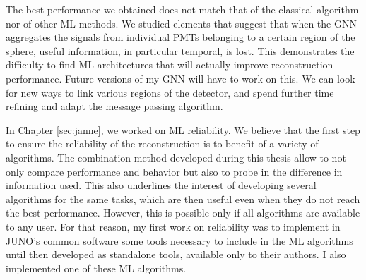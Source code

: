 \documentclass[../main.tex]{subfiles}
\begin{document}
The best performance we obtained does not match that of the classical algorithm nor of other ML methods. We studied elements that suggest that when the GNN aggregates the signals from individual PMTs belonging to a certain region of the sphere, useful information, in particular temporal, is lost. This demonstrates the difficulty to find ML architectures that will actually improve reconstruction performance. Future versions of my GNN will have to work on this. We can look for new ways to link various regions of the detector, and spend further time refining and adapt the message passing algorithm.

\hfill

%
%

In Chapter \ref{sec:janne}, we worked on ML reliability. We believe that the first step to ensure the reliability of the reconstruction is to benefit of a variety of algorithms. The combination method developed during this thesis allow to not only compare performance and behavior but also to probe in the difference in information used. This also underlines the interest of developing several algorithms for the same tasks, which are then useful even when they do not reach the best performance.
However, this is possible only if all algorithms are available to any user. For that reason, my first work on reliability was to implement in JUNO's common software some tools necessary to include in the ML algorithms until then developed as standalone tools, available only to their authors. I also implemented one of these ML algorithms.
\end{document}
